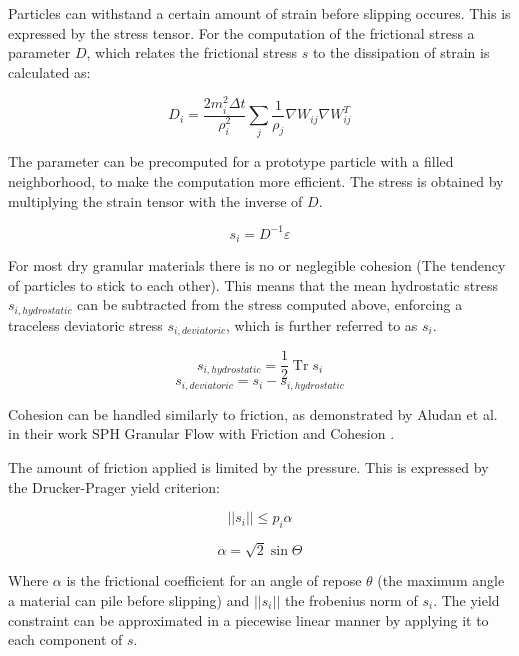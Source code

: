 \documentclass[intern]{cgMA}
\DeclareMathOperator{\Tr}{Tr}
\begin{document}
    Particles can withstand a certain amount of strain before slipping occures. This is expressed by the stress tensor. For the computation of the frictional stress a parameter $D$, which relates the frictional stress $s$ to the dissipation of strain is calculated as:

    \begin{equation}
        D_i = \frac{2 m_i^2 \Delta t}{\rho_i^2} \sum_j \frac{1}{\rho_j} \nabla W_{ij}  \nabla W_{ij}^T
    \end{equation}
    
    The parameter can be precomputed for a prototype particle with a filled neighborhood, to make the computation more efficient.
    The stress is obtained by multiplying the strain tensor with the inverse of $D$. 
    
    \begin{equation}
        s_i = D^{-1} \varepsilon
    \end{equation}

    For most dry granular materials there is no or neglegible cohesion (The tendency of particles to stick to each other). This means that the mean hydrostatic stress $s_{i, hydrostatic}$ can be subtracted from the stress computed above, enforcing a traceless deviatoric stress $s_{i, deviatoric}$, which is further referred to as $s_i$. 

    \begin{equation}
        s_{i, hydrostatic} = \frac{1}{2} \Tr s_i 
    \end{equation}
    \begin{equation}
        s_{i, deviatoric} = s_i - s_{i, hydrostatic} 
    \end{equation}

    Cohesion can be handled similarly to friction, as demonstrated by Aludan et al. in their work SPH Granular Flow with Friction and Cohesion \cite{10.1145/2019406.2019410}.

    The amount of friction applied is limited by the pressure. This is expressed by the Drucker-Prager yield criterion:

    \begin{equation}
        ||s_i|| \leq p_i \alpha
    \end{equation}

    \begin{equation}
        \alpha = \sqrt{2} \sin \Theta
    \end{equation}

    Where $\alpha$ is the frictional coefficient for an angle of repose $\theta$ (the maximum angle a material can pile before slipping) and $||s_i||$ the frobenius norm of $s_i$. The yield constraint can be approximated in a piecewise linear manner by applying it to each component of $s$. \cite{10.1145/2019406.2019410} \cite{10.2312:PE:vriphys:vriphys12:053-060} \cite{10.2312:LocalChapterEvents:CEIG:CEIG09:011-018} \cite{10.1145/1866158.1866195}
\end{document}

